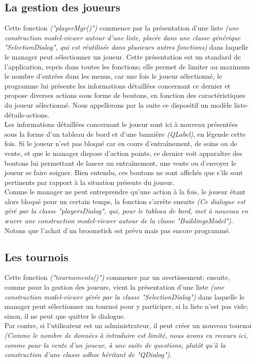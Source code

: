 \documentclass[a4paper,titlepage]{scrreprt}
\begin{document}
\subsection{La gestion des joueurs}
Cette fonction \emph{("playerMgr()")} commence par la présentation d'une liste
\emph{(une construction model-viewer autour d'une liste, placée dans une classe générique "SelectionDialog",
qui est réutilisée dans plusieurs autres fonctions)}
dans laquelle le manager peut sélectionner un joueur.
Cette présentation est un standard de l'application, repris dans toutes les fonctions;
elle permet de limiter au maximum le nombre d'entrées dans les menus,
car une fois le joueur sélectionné,
le programme lui présente les informations détaillées concernant ce dernier
et propose diverses actions sous forme de boutons,
en fonction des caractéristiques du joueur sélectionné.
Nous appellerons par la suite ce dispositif un modèle liste-détails-actions.\\
Les informations détaillées concernant le joueur sont ici à nouveau présentées sous la forme
d'un tableau de bord et d'une bannière \emph{(QLabel)}, en légende cette fois.
Si le joueur n'est pas bloqué car en cours d'entraînement, de soins ou de vente,
et que le manager dispose d'action points,
ce dernier voit apparaître des boutons lui permettant de lancer un entraînement, une vente
ou d'envoyer le joueur se faire soigner.
Bien entendu, ces boutons ne sont affichés que s'ils sont pertinents
par rapport à la situation présente du joueur.\\
Comme le manager ne peut entreprendre qu'une action à la fois,
le joueur étant alors bloqué pour un certain temps, la fonction s'arrête ensuite
\emph{(Ce dialogue est géré par la classe "playersDialog", qui, pour le tableau de bord,
met à nouveau en \oe uvre une construction model-viewer autour de la classe "BuildingsModel")}.
Notons que l'achat d'un broomstick est prévu mais pas encore programmé.
\subsection{Les tournois}
Cette fonction \emph{("tournaments()")} commence par un avertissement;
ensuite, comme pour la gestion des joueurs, vient la présentation d'une liste 
\emph{(une construction model-viewer gérée par la classe "SelectionDialog")}
dans laquelle le manager peut sélectionner un tournoi pour y participer,
si la liste n'est pas vide; sinon, il ne peut que quitter le dialogue.\\
Par contre, si l'utilisateur est un administrateur, il peut créer un nouveau tournoi
\emph{(Comme le nombre de données à introduire est limité,
nous avons eu recours ici, comme pour la vente d'un joueur, à une suite de questions,
plutôt qu'à la construction d'une classe adhoc héritant de "QDialog")}.
\end{document}
